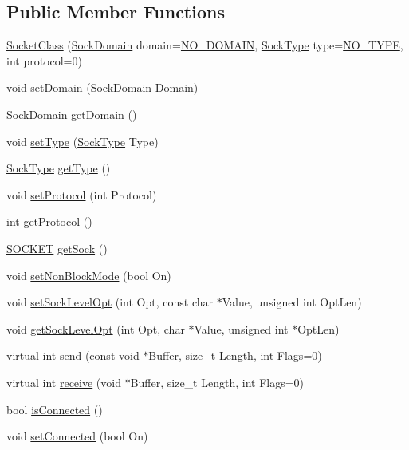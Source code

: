 \subsection*{Public Member Functions}
\begin{DoxyCompactItemize}
\item 
\hyperlink{classSocketClass_a6a12a3d812e5063bf9f432fdf81ad059}{Socket\+Class} (\hyperlink{classSocketClass_ac940413abaa7328db8518a9f121babb6}{Sock\+Domain} domain=\hyperlink{classSocketClass_ac940413abaa7328db8518a9f121babb6aa9ec2a4d642c47813fe90f362603f1c4}{N\+O\+\_\+\+D\+O\+M\+A\+IN}, \hyperlink{classSocketClass_a2182dd9fee09459fabb99e6ae717f595}{Sock\+Type} type=\hyperlink{classSocketClass_a2182dd9fee09459fabb99e6ae717f595a8c7f955ea5b71498ff1d469345d813ad}{N\+O\+\_\+\+T\+Y\+PE}, int protocol=0)
\item 
void \hyperlink{classSocketClass_af1b60fc7b1b9fb0ce1ec999f65ca2bf0}{set\+Domain} (\hyperlink{classSocketClass_ac940413abaa7328db8518a9f121babb6}{Sock\+Domain} Domain)
\item 
\hyperlink{classSocketClass_ac940413abaa7328db8518a9f121babb6}{Sock\+Domain} \hyperlink{classSocketClass_a688a08cbfa372250ee43af869c75965e}{get\+Domain} ()
\item 
void \hyperlink{classSocketClass_aac96804301f30f4df5b999ac7526c0a9}{set\+Type} (\hyperlink{classSocketClass_a2182dd9fee09459fabb99e6ae717f595}{Sock\+Type} Type)
\item 
\hyperlink{classSocketClass_a2182dd9fee09459fabb99e6ae717f595}{Sock\+Type} \hyperlink{classSocketClass_a077cfe52ecf67e96b1e896b0b5d69482}{get\+Type} ()
\item 
void \hyperlink{classSocketClass_a2e0eb914abb3afe3b52ae674b4d26efb}{set\+Protocol} (int Protocol)
\item 
int \hyperlink{classSocketClass_ad325d4555d76b15490d3f336bbe7c420}{get\+Protocol} ()
\item 
\hyperlink{sockclasslib_8h_a8dc8083897335125630f1af5dafd5831}{S\+O\+C\+K\+ET} \hyperlink{classSocketClass_a15c1b7310583c7d671c6800ebb3c87e6}{get\+Sock} ()
\item 
void \hyperlink{classSocketClass_ab05fc77da53f984aa44a4f7c48511e41}{set\+Non\+Block\+Mode} (bool On)
\item 
void \hyperlink{classSocketClass_abf34df090cb8e94a46e7dc782171d44a}{set\+Sock\+Level\+Opt} (int Opt, const char $\ast$Value, unsigned int Opt\+Len)
\item 
void \hyperlink{classSocketClass_a9f04bb6b5155b4845fca34805bd4c773}{get\+Sock\+Level\+Opt} (int Opt, char $\ast$Value, unsigned int $\ast$Opt\+Len)
\item 
virtual int \hyperlink{classSocketClass_a5fed2b2487ea2b82077ce15158e0674c}{send} (const void $\ast$Buffer, size\+\_\+t Length, int Flags=0)
\item 
virtual int \hyperlink{classSocketClass_a065cdcd833f0688b6d6bdca6ed92e27b}{receive} (void $\ast$Buffer, size\+\_\+t Length, int Flags=0)
\item 
bool \hyperlink{classSocketClass_a00d9b8d98e62c1c239fe35fb15f35fda}{is\+Connected} ()
\item 
void \hyperlink{classSocketClass_af8eab885f8e9d845424d7819a5653591}{set\+Connected} (bool On)
\end{DoxyCompactItemize}
